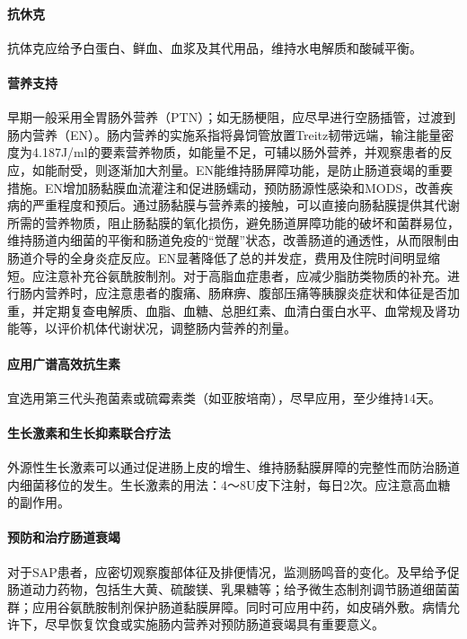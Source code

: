 \paragraph{抗休克}

抗体克应给予白蛋白、鲜血、血浆及其代用品，维持水电解质和酸碱平衡。

\paragraph{营养支持}

早期一般采用全胃肠外营养（PTN）；如无肠梗阻，应尽早进行空肠插管，过渡到肠内营养（EN）。肠内营养的实施系指将鼻饲管放置Treitz韧带远端，输注能量密度为4.187J/ml的要素营养物质，如能量不足，可辅以肠外营养，并观察患者的反应，如能耐受，则逐渐加大剂量。EN能维持肠屏障功能，是防止肠道衰竭的重要措施。EN增加肠黏膜血流灌注和促进肠蠕动，预防肠源性感染和MODS，改善疾病的严重程度和预后。通过肠黏膜与营养素的接触，可以直接向肠黏膜提供其代谢所需的营养物质，阻止肠黏膜的氧化损伤，避免肠道屏障功能的破坏和菌群易位，维持肠道内细菌的平衡和肠道免疫的“觉醒”状态，改善肠道的通透性，从而限制由肠道介导的全身炎症反应。EN显著降低了总的并发症，费用及住院时间明显缩短。应注意补充谷氨酰胺制剂。对于高脂血症患者，应减少脂肪类物质的补充。进行肠内营养时，应注意患者的腹痛、肠麻痹、腹部压痛等胰腺炎症状和体征是否加重，并定期复查电解质、血脂、血糖、总胆红素、血清白蛋白水平、血常规及肾功能等，以评价机体代谢状况，调整肠内营养的剂量。

\paragraph{应用广谱高效抗生素}

宜选用第三代头孢菌素或硫霉素类（如亚胺培南），尽早应用，至少维持14天。

\paragraph{生长激素和生长抑素联合疗法}

外源性生长激素可以通过促进肠上皮的增生、维持肠黏膜屏障的完整性而防治肠道内细菌移位的发生。生长激素的用法：4～8U皮下注射，每日2次。应注意高血糖的副作用。

\paragraph{预防和治疗肠道衰竭}

对于SAP患者，应密切观察腹部体征及排便情况，监测肠鸣音的变化。及早给予促肠道动力药物，包括生大黄、硫酸镁、乳果糖等；给予微生态制剂调节肠道细菌菌群；应用谷氨酰胺制剂保护肠道黏膜屏障。同时可应用中药，如皮硝外敷。病情允许下，尽早恢复饮食或实施肠内营养对预防肠道衰竭具有重要意义。

